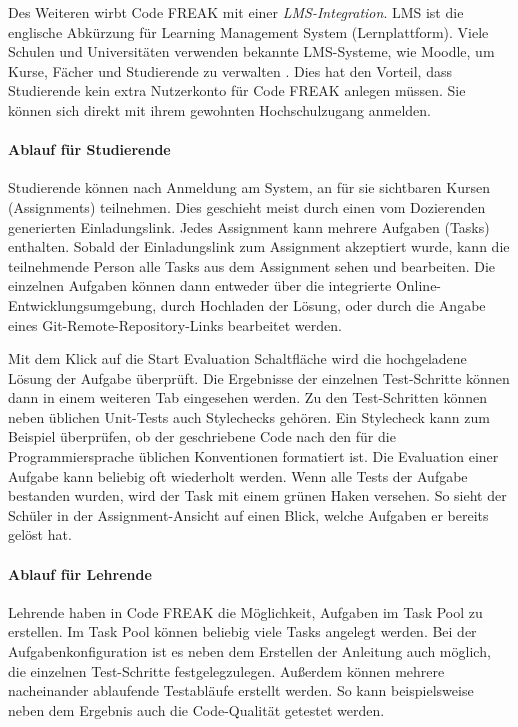 Des Weiteren wirbt Code FREAK mit einer \emph{LMS-Integration}. LMS ist die
englische Abkürzung für Learning Management System (Lernplattform). Viele
Schulen und Universitäten verwenden bekannte LMS-Systeme, wie Moodle, um Kurse,
Fächer und Studierende zu verwalten \parencite{moodle}. Dies hat den Vorteil,
dass Studierende kein extra Nutzerkonto für Code FREAK anlegen müssen. Sie
können sich direkt mit ihrem gewohnten Hochschulzugang anmelden.

\paragraph{Ablauf für Studierende}
Studierende können nach Anmeldung am System, an für sie sichtbaren Kursen
(Assignments) teilnehmen. Dies geschieht meist durch einen vom Dozierenden
generierten Einladungslink. Jedes Assignment kann mehrere Aufgaben (Tasks)
enthalten. Sobald der Einladungslink zum Assignment akzeptiert
wurde, kann die teilnehmende Person alle Tasks aus dem Assignment sehen und
bearbeiten. Die einzelnen Aufgaben können dann entweder über die integrierte
Online-Entwicklungsumgebung, durch Hochladen der Lösung, oder durch die Angabe
eines Git-Remote-Repository-Links bearbeitet werden.

Mit dem Klick auf die \glqq Start Evaluation\grqq{} Schaltfläche wird die
hochgeladene Lösung der Aufgabe überprüft. Die Ergebnisse der einzelnen
Test-Schritte können dann in einem weiteren Tab eingesehen werden. Zu den
Test-Schritten können neben üblichen Unit-Tests auch Stylechecks gehören. Ein
Stylecheck kann zum Beispiel überprüfen, ob der geschriebene Code nach den für
die Programmiersprache üblichen Konventionen formatiert ist. Die Evaluation
einer Aufgabe kann beliebig oft wiederholt werden. Wenn alle Tests der Aufgabe
bestanden wurden, wird der Task mit einem grünen Haken versehen. So sieht der
Schüler in der Assignment-Ansicht auf einen Blick, welche Aufgaben er bereits
gelöst hat.

\paragraph{Ablauf für Lehrende}
Lehrende haben in Code FREAK die Möglichkeit, Aufgaben im Task Pool zu
erstellen. Im Task Pool können beliebig viele Tasks angelegt werden. Bei der
Aufgabenkonfiguration ist es neben dem Erstellen der Anleitung auch möglich, die
einzelnen Test-Schritte festgelegzulegen. Außerdem können mehrere nacheinander
ablaufende Testabläufe erstellt werden. So kann beispielsweise neben dem
Ergebnis auch die Code-Qualität getestet werden.


